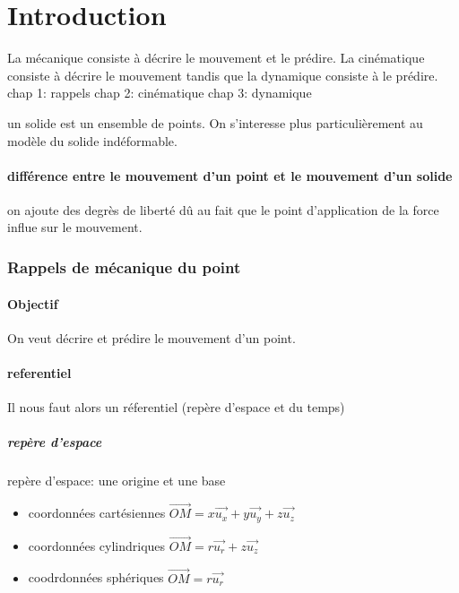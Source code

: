 \documentclass[../main.tex]{subfile}
\begin{document}
\part{Introduction}

La mécanique consiste à décrire le mouvement et le prédire.
La cinématique consiste à décrire le mouvement tandis que la dynamique consiste à le prédire.
chap 1: rappels
chap 2: cinématique
chap 3: dynamique


\begin{defi}
	
un solide est un ensemble de points.
On s'interesse plus particulièrement au modèle du solide indéformable.

\end{defi}

\subsection{différence entre le mouvement d'un point et le mouvement d'un solide}
on ajoute des degrès de liberté dû au fait que le point d'application de la force influe sur le mouvement.


\section{Rappels de mécanique du point}

\subsection{Objectif}
On veut décrire et prédire le mouvement d'un point.

\subsection{referentiel}
Il nous faut alors un réferentiel (repère d'espace et du temps)
\subsubsection{repère d'espace}
repère d'espace: une origine et une base
\begin{itemize}
	\item coordonnées cartésiennes 
	$\vec{OM} = x\vec{u_x} + y\vec{u_y} + z\vec{u_z}$
	\item coordonnées cylindriques
	$\vec{OM} = r\vec{u_r} + z\vec{u_z}$
	\item coodrdonnées sphériques
	$\vec{OM} = r\vec{u_r}$
\end{itemize}
\end{document}
